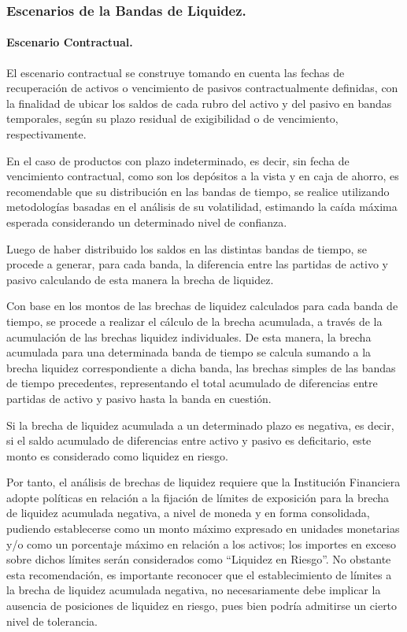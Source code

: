 \documentclass[]{article}
\begin{document}
\hypertarget{escenarios-de-la-bandas-de-liquidez.}{%
\subsubsection{Escenarios de la Bandas de
Liquidez.}\label{escenarios-de-la-bandas-de-liquidez.}}

\hypertarget{escenario-contractual.}{%
\paragraph{Escenario Contractual.}\label{escenario-contractual.}}

El escenario contractual se construye tomando en cuenta las fechas de
recuperación de activos o vencimiento de pasivos contractualmente
definidas, con la finalidad de ubicar los saldos de cada rubro del
activo y del pasivo en bandas temporales, según su plazo residual de
exigibilidad o de vencimiento, respectivamente.

En el caso de productos con plazo indeterminado, es decir, sin fecha de
vencimiento contractual, como son los depósitos a la vista y en caja de
ahorro, es recomendable que su distribución en las bandas de tiempo, se
realice utilizando metodologías basadas en el análisis de su
volatilidad, estimando la caída máxima esperada considerando un
determinado nivel de confianza.

Luego de haber distribuido los saldos en las distintas bandas de tiempo,
se procede a generar, para cada banda, la diferencia entre las partidas
de activo y pasivo calculando de esta manera la brecha de liquidez.

Con base en los montos de las brechas de liquidez calculados para cada
banda de tiempo, se procede a realizar el cálculo de la brecha
acumulada, a través de la acumulación de las brechas liquidez
individuales. De esta manera, la brecha acumulada para una determinada
banda de tiempo se calcula sumando a la brecha liquidez correspondiente
a dicha banda, las brechas simples de las bandas de tiempo precedentes,
representando el total acumulado de diferencias entre partidas de activo
y pasivo hasta la banda en cuestión.

Si la brecha de liquidez acumulada a un determinado plazo es negativa,
es decir, si el saldo acumulado de diferencias entre activo y pasivo es
deficitario, este monto es considerado como liquidez en riesgo.

Por tanto, el análisis de brechas de liquidez requiere que la
Institución Financiera adopte políticas en relación a la fijación de
límites de exposición para la brecha de liquidez acumulada negativa, a
nivel de moneda y en forma consolidada, pudiendo establecerse como un
monto máximo expresado en unidades monetarias y/o como un porcentaje
máximo en relación a los activos; los importes en exceso sobre dichos
límites serán considerados como ``Liquidez en Riesgo''. No obstante esta
recomendación, es importante reconocer que el establecimiento de límites
a la brecha de liquidez acumulada negativa, no necesariamente debe
implicar la ausencia de posiciones de liquidez en riesgo, pues bien
podría admitirse un cierto nivel de tolerancia.
\end{document}
